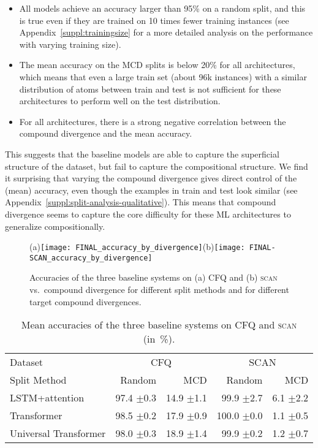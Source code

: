 \documentclass[letterpaper]{article}
\newcommand{\SCAN}{\textsc{scan}}
\begin{document}
\begin{itemize}
    \item All models achieve an accuracy larger than 95\% on a random split, and this is true even if they are trained on 10 times fewer training instances (see Appendix~\ref{suppl:trainingsize} for a more detailed analysis on the performance with varying training size).
    
    \item The mean accuracy on the MCD splits is below 20\% for all architectures, which means that even a large train set (about 96k instances) with a similar distribution of atoms between train and test is not sufficient for these architectures to perform well on the test distribution.
    
    \item For all architectures, there is a strong negative correlation between the compound divergence and the mean accuracy.
\end{itemize}

This suggests that the baseline models are able to capture the superficial structure of the dataset, but fail to capture the compositional structure. We find it surprising that varying the compound divergence gives direct control of the (mean) accuracy, even though the examples in train and test look similar (see Appendix~\ref{suppl:split-analysis-qualitative}). This means that compound divergence seems to capture the core difficulty for these ML architectures to generalize compositionally.

\begin{figure}[tb]
    \centering \footnotesize
    (a)\texttt{[image: FINAL\_accuracy\_by\_divergence]}\hfill (b)\texttt{[image: FINAL-SCAN\_accuracy\_by\_divergence]}\caption{Accuracies of the three baseline systems on (a) CFQ and (b) \SCAN{} vs.\ compound divergence for different split methods and for different target compound divergences.}
    \label{fig:overall-comparison}
\end{figure}
\begin{table}[tb]
    \caption{Mean accuracies of the three baseline systems on CFQ and \SCAN{} (in~\%).}
    \centering \small
    \begin{tabular}{@{}lrrrr@{}}
        \hline
        Dataset & \multicolumn{2}{c}{CFQ}  & \multicolumn{2}{c}{SCAN} \\
        Split Method & Random & MCD  & Random & MCD \\
    \hline
    \hline
     LSTM+attention        & 97.4   $\pm$0.3 &  14.9   $\pm$1.1  &         99.9  $\pm$2.7 & 6.1   $\pm$2.2 \\
     Transformer           & 98.5   $\pm$0.2 &   17.9   $\pm$0.9  &        100.0  $\pm$0.0 & 1.1   $\pm$0.5 \\
     Universal Transformer & 98.0   $\pm$0.3 &   18.9   $\pm$1.4  &         99.9  $\pm$0.2 & 1.2   $\pm$0.7 \\
    \hline
    \end{tabular}
    \label{table:acc}
\end{table}
\end{document}
